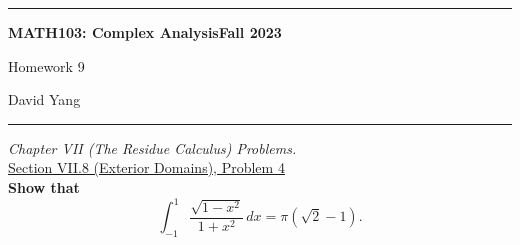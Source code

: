 \documentclass[11pt]{article}
\theoremstyle{definition}
\begin{document}
	\hrule
	\begin{center}
        \textbf{MATH103: Complex Analysis}\hfill \textbf{Fall 2023}\newline


		{\Large Homework 9}

		David Yang
	\end{center}

\hrule

\vspace{1em}


\textit{Chapter VII (The Residue Calculus) Problems.} \\

\underline{Section VII.8 (Exterior Domains), Problem 4}\\

\textbf{Show that}
\[ \int_{-1}^1 \frac{\sqrt{1-x^2}}{1+x^2} \, dx = \pi(\sqrt{2} - 1).\]
\end{document}
